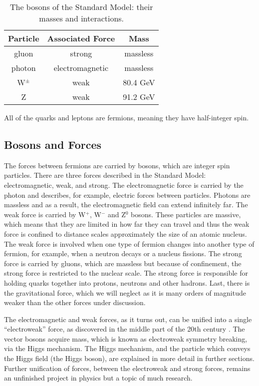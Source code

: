 \begin{table}
	\caption{The bosons of the Standard Model: their masses and interactions.  \label{tab:boson_table}}
    \center
	\begin{tabular}{| c || c | c |}
	\hline
	Particle & Associated Force & Mass \\
	\hline
	gluon & strong & massless \\
	photon & electromagnetic & massless \\
	W$^\pm$ & weak & 80.4 GeV \\
	Z & weak & 91.2 GeV \\ 
	\hline
	\end{tabular}
\end{table}


All of the quarks and leptons are fermions, meaning they have half-integer spin.

\subsection{Bosons and Forces}

The forces between fermions are carried by bosons, which are integer spin particles.  There are three forces described in the Standard Model: electromagnetic, weak, and strong.  The electromagnetic force is carried by the photon and describes, for example, electric forces between particles.  Photons are massless and as a result, the electromagnetic field can extend infinitely far.  The weak force is carried by W$^+$, W$^-$ and Z$^0$ bosons.  These particles are massive, which means that they are limited in how far they can travel and thus the weak force is confined to distance scales approximately the size of an atomic nucleus.  The weak force is involved when one type of fermion changes into another type of fermion, for example, when a neutron decays or a nucleus fissions.  The strong force is carried by gluons, which are massless but because of confinement, the strong force is restricted to the nuclear scale.  The strong force is responsible for holding quarks together into protons, neutrons and other hadrons. Last, there is the gravitational force, which we will neglect as it is many orders of magnitude weaker than the other forces under discussion.

The electromagnetic and weak forces, as it turns out, can be unified into a single ``electroweak'' force, as discovered in the middle part of the 20th century \cite{Weinberg}.  The vector bosons acquire mass, which is known as electroweak symmetry breaking, via the Higgs mechanism.  The Higgs mechanism, and the particle which conveys the Higgs field (the Higgs boson), are explained in more detail in further sections.  Further unification of forces, between the electroweak and strong forces, remains an unfinished project in physics but a topic of much research.  

